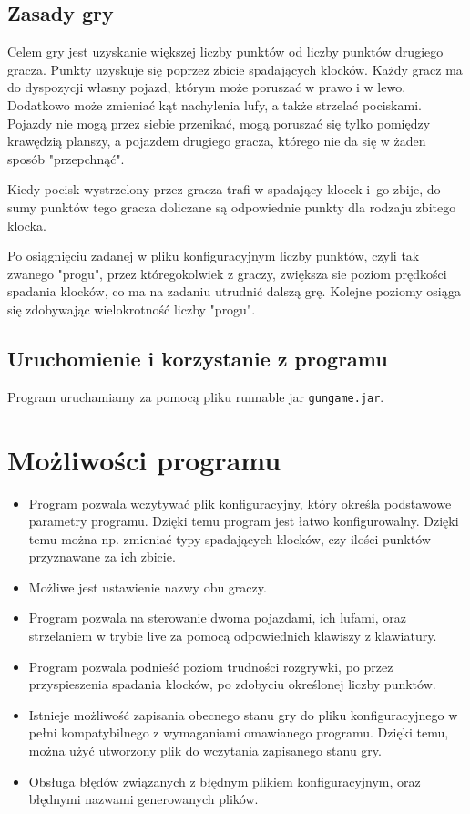 \documentclass[12pt]{report}
\newcommand{\code}[1]{\texttt{#1}}
\begin{document}
\subsection{Zasady gry}
Celem gry jest uzyskanie większej liczby punktów od liczby punktów drugiego gracza. Punkty uzyskuje się poprzez zbicie spadających klocków. Każdy gracz ma do dyspozycji własny pojazd, którym może poruszać w prawo i w lewo. Dodatkowo może zmieniać kąt nachylenia lufy, a także strzelać pociskami. Pojazdy nie mogą przez siebie przenikać, mogą poruszać się tylko pomiędzy krawędzią planszy, a pojazdem drugiego gracza, którego nie da się w żaden sposób "przepchnąć".\par
    Kiedy pocisk wystrzelony przez gracza  trafi w spadający klocek i~go zbije, do sumy punktów tego gracza doliczane są odpowiednie punkty dla rodzaju zbitego klocka. \par
Po osiągnięciu zadanej w pliku konfiguracyjnym liczby punktów, czyli tak zwanego "progu", przez któregokolwiek z graczy, zwiększa sie poziom prędkości spadania klocków, co ma na zadaniu utrudnić dalszą grę. Kolejne poziomy osiąga się zdobywając wielokrotność liczby "progu".

\subsection{Uruchomienie i korzystanie z programu}
Program uruchamiamy za pomocą pliku runnable jar \code{gungame.jar}.
\section{Możliwości programu}
\begin{itemize}
    \item Program pozwala wczytywać plik konfiguracyjny, który określa podstawowe parametry programu. Dzięki temu program jest łatwo konfigurowalny. Dzięki temu można np. zmieniać typy spadających klocków, czy ilości punktów przyznawane za ich zbicie.
    \item Możliwe jest ustawienie nazwy obu graczy.
    \item Program pozwala na sterowanie dwoma pojazdami, ich lufami, oraz strzelaniem w trybie live za pomocą odpowiednich klawiszy z klawiatury.
    \item Program pozwala podnieść poziom trudności rozgrywki, po przez przyspieszenia spadania klocków, po zdobyciu określonej liczby punktów.
    \item Istnieje możliwość zapisania obecnego stanu gry do pliku konfiguracyjnego w pełni kompatybilnego z wymaganiami omawianego programu. Dzięki temu, można użyć utworzony plik do wczytania zapisanego stanu gry.
    \item Obsługa błędów związanych z błędnym plikiem konfiguracyjnym, oraz błędnymi nazwami generowanych plików.
\end{itemize}
\end{document}
